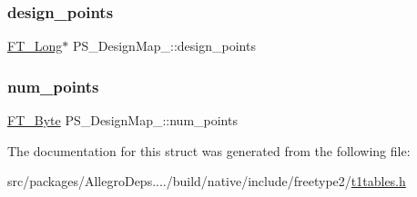 \subsubsection{\texorpdfstring{design\+\_\+points}{design\_points}}
{\footnotesize\ttfamily \hyperlink{fttypes_8h_a7fa72a1f0e79fb1860c5965789024d6f}{F\+T\+\_\+\+Long}$\ast$ P\+S\+\_\+\+Design\+Map\+\_\+\+::design\+\_\+points}

\mbox{\label{struct_p_s___design_map___a505a70dd0f497f177fffca9bc4e5d0a5}} 
\subsubsection{\texorpdfstring{num\+\_\+points}{num\_points}}
{\footnotesize\ttfamily \hyperlink{fttypes_8h_a51f26183ca0c9f4af958939648caeccd}{F\+T\+\_\+\+Byte} P\+S\+\_\+\+Design\+Map\+\_\+\+::num\+\_\+points}



The documentation for this struct was generated from the following file\+:\begin{DoxyCompactItemize}
\item 
src/packages/\+Allegro\+Deps..../build/native/include/freetype2/\hyperlink{t1tables_8h}{t1tables.\+h}\end{DoxyCompactItemize}
